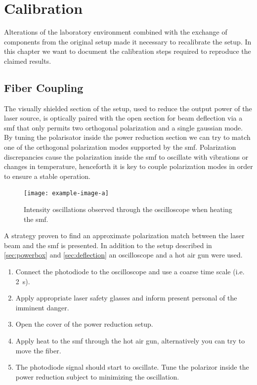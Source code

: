 \chapter{Calibration}

Alterations of the laboratory environment combined with the exchange of
components from the original setup made it necessary to recalibrate the setup.
In this chapter we want to document the calibration steps required to
reproduce the claimed results.

\section{Fiber Coupling}

The visually shielded section of the setup, used to reduce the output power
of the laser source, is optically paired with the open section for beam
deflection via a \gls{smf} that only permits two orthogonal polarization and
a single gaussian mode. By tuning the polarisator inside the power
reduction section we can try to match one of the orthogonal polarization
modes supported by the \gls{smf}. Polarization discrepancies cause the
polarization inside the \gls{smf} to oscillate with vibrations or changes in
temperature, henceforth it is key to couple polarization modes in order to
ensure a stable operation.

\begin{figure}[ht]
  \centering
  \texttt{[image: example-image-a]}
  \caption{Intensity oscillations observed through the oscilloscope when
  heating the \gls{smf}.}
  \label{fig:fibercoup}
\end{figure}

A strategy proven to find an approximate polarization match between the
laser beam and the \gls{smf} is presented. In addition to the setup described
in \cref{sec:powerbox} and \cref{sec:deflection} an oscilloscope and a hot
air gun were used.

\begin{enumerate}
  \item Connect the photodiode to the oscilloscope and use a coarse time
    scale (i.e. \SI{2}{\second}).
  \item Apply appropriate laser safety glasses and inform present personal
    of the imminent danger.
  \item Open the cover of the power reduction setup.
  \item Apply heat to the \gls{smf} through the hot air gun, alternatively
    you can try to move the fiber.
  \item The photodiode signal should start to oscillate. Tune the polarizor
    inside the power reduction subject to minimizing the oscillation.
\end{enumerate}

